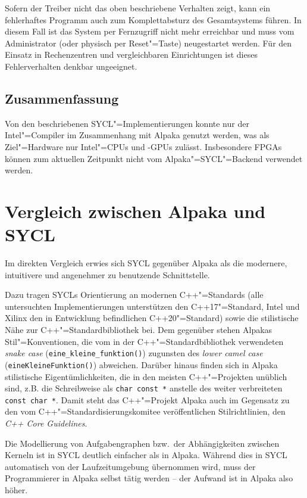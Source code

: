 Sofern der Treiber nicht das oben beschriebene Verhalten zeigt, kann ein
fehlerhaftes Programm auch zum Komplettabsturz des Gesamtsystems führen. In
diesem Fall ist das System per Fernzugriff nicht mehr erreichbar und muss
vom Administrator (oder physisch per Reset"=Taste) neugestartet werden. Für den
Einsatz in Rechenzentren und vergleichbaren Einrichtungen ist dieses
Fehlerverhalten denkbar ungeeignet.

\subsection{Zusammenfassung}
 
Von den beschriebenen SYCL"=Implementierungen konnte nur der Intel"=Compiler im
Zusammenhang mit Alpaka genutzt werden, was als Ziel"=Hardware nur Intel"=CPUs
und -GPUs zulässt. Insbesondere FPGAs können zum aktuellen Zeitpunkt nicht vom
Alpaka"=SYCL"=Backend verwendet werden.

\section{Vergleich zwischen Alpaka und SYCL}

Im direkten Vergleich erwies sich SYCL gegenüber Alpaka als die modernere,
intuitivere und angenehmer zu benutzende Schnittstelle.

Dazu tragen SYCLs Orientierung an modernen C++"=Standards (alle untersuchten
Implementierungen unterstützen den C++17"=Standard, Intel und Xilinx den in
Entwicklung befindlichen C++20"=Standard) sowie die stilistische Nähe zur
C++"=Standardbibliothek bei. Dem gegenüber stehen Alpakas Stil"=Konventionen,
die vom in der C++"=Standardbibliothek verwendeten \textit{snake case}
(\texttt{eine\_kleine\_funktion()}) zugunsten des
\textit{lower camel case} (\texttt{eineKleineFunktion()}) abweichen. Darüber
hinaus finden sich in Alpaka stilistische Eigentümlichkeiten, die in den meisten
C++"=Projekten unüblich sind, z.B. die Schreibweise als \texttt{char const *}
anstelle des weiter verbreiteten \texttt{const char *}. Damit steht das
C++"=Projekt Alpaka auch im Gegensatz zu den vom C++"=Standardisierungskomitee
veröffentlichen Stilrichtlinien, den \textit{C++ Core Guidelines}.

Die Modellierung von Aufgabengraphen bzw.\ der Abhängigkeiten zwischen Kerneln
ist in SYCL deutlich einfacher als in Alpaka. Während dies in SYCL automatisch
von der Laufzeitumgebung übernommen wird, muss der Programmierer in Alpaka
selbst tätig werden -- der Aufwand ist in Alpaka also höher.

